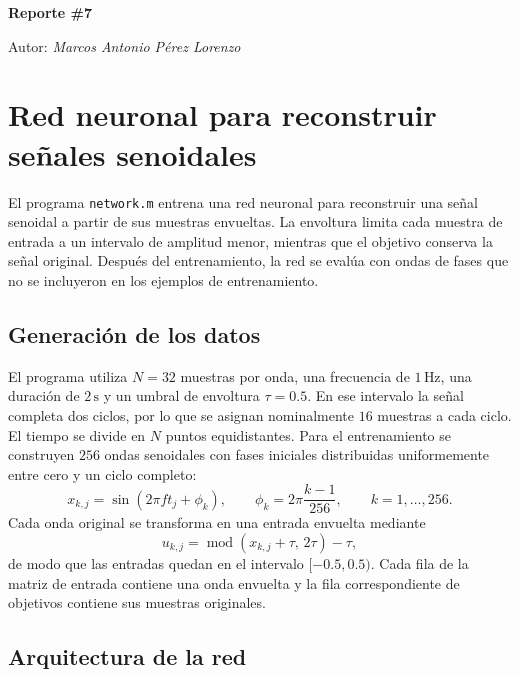 \documentclass[12pt,a4paper]{article}
\begin{document}
\begin{titlepage}

  \centering
  {\huge\bfseries Reporte \#7\par}
	{\Large Autor: \itshape Marcos Antonio Pérez Lorenzo\par}
\end{titlepage}

\pagebreak

\section{Red neuronal para reconstruir señales senoidales}

El programa \texttt{network.m} entrena una red neuronal para reconstruir una señal senoidal a partir de sus muestras envueltas. La envoltura limita cada muestra de entrada a un intervalo de amplitud menor, mientras que el objetivo conserva la señal original. Después del entrenamiento, la red se evalúa con ondas de fases que no se incluyeron en los ejemplos de entrenamiento.

\subsection{Generación de los datos}

El programa utiliza \(N=32\) muestras por onda, una frecuencia de \(1\,\text{Hz}\), una duración de \(2\,\text{s}\) y un umbral de envoltura \(\tau=0.5\). En ese intervalo la señal completa dos ciclos, por lo que se asignan nominalmente \(16\) muestras a cada ciclo. El tiempo se divide en \(N\) puntos equidistantes. Para el entrenamiento se construyen \(256\) ondas senoidales con fases iniciales distribuidas uniformemente entre cero y un ciclo completo:
\begin{equation*}
  x_{k,j}=\sin\!\left(2\pi f t_j+\phi_k\right),
  \qquad
  \phi_k=2\pi\frac{k-1}{256},
  \qquad k=1,\ldots,256.
\end{equation*}
Cada onda original se transforma en una entrada envuelta mediante
\begin{equation*}
  u_{k,j}=\operatorname{mod}\!\left(x_{k,j}+\tau,\,2\tau\right)-\tau,
\end{equation*}
de modo que las entradas quedan en el intervalo \([-0.5,0.5)\). Cada fila de la matriz de entrada contiene una onda envuelta y la fila correspondiente de objetivos contiene sus muestras originales.

\subsection{Arquitectura de la red}
\end{document}
